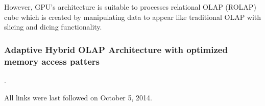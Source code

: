 \documentclass[runningheads,a4paper]{llncs}
\begin{document}
However, GPU's architecture is suitable to processes relational OLAP (ROLAP) cube which is created by manipulating data to appear like traditional OLAP with slicing and dicing functionality.\\
\newpage
\subsubsection{Adaptive Hybrid OLAP Architecture with optimized memory access patters}.
\\
\lipsum[1]

\newpage



All links were last followed on October 5, 2014.
\nocite{*}
\end{document}
